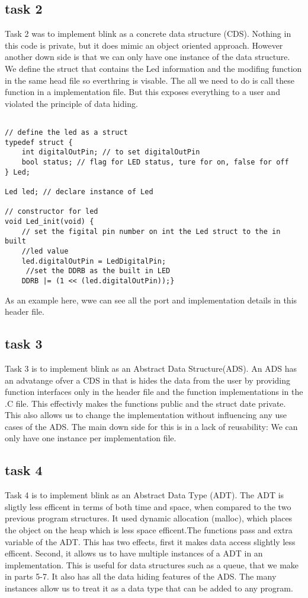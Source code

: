 \subsection{task 2}
Task 2 was to implement blink as a concrete data structure (CDS). Nothing in this code is private, but it does mimic an object oriented approach. However another down side is that we can only have one instance of the data structure. We define the  struct that contains the Led information and the modifing function in the same head file so everthring is visable. The all we need to do is call these function in a implementation file. But this exposes everything to a user and violated the principle of data hiding. 
\begin{lstlisting}

// define the led as a struct
typedef struct {
	int digitalOutPin; // to set digitalOutPin
	bool status; // flag for LED status, ture for on, false for off
} Led;

Led led; // declare instance of Led

// constructor for led
void Led_init(void) {
	// set the figital pin number on int the Led struct to the in built 
	//led value
	led.digitalOutPin = LedDigitalPin;
	 //set the DDRB as the built in LED
	DDRB |= (1 << (led.digitalOutPin));}

\end{lstlisting}

As an example here, wwe can see all the port and implementation details in this header file.\\

\subsection{task 3}
Task 3 is to implement blink as an Abstract Data Structure(ADS). An ADS has an advatange ofver a CDS in that is hides the data from the user by providing function interfaces only in the header file and the function implementations in the .C file. This effectivly makes the functions public and the struct date private. This also allows us to change the implementation without influencing any use cases of the ADS. The main down side for this is in a lack of reusability: We can only have one instance per implementation file. 

\subsection{task 4}
Task 4 is to implement blink as an Abstract Data Type (ADT). The ADT is sligtly less efficent in terms of both time and space, when compared to the two previous program structures. It used dynamic allocation (malloc), which places the object on the heap which is less space efficent.The functions pass and extra variable of the ADT. This has two effects, first it makes data access slightly less efficent. Second, it allows us to have multiple instances of a ADT in an implementation. This is useful for data structures such as a queue, that we make in parts 5-7. It also has all the data hiding features of the ADS. The many instances allow us to treat it as a data type that can be added to any program.

